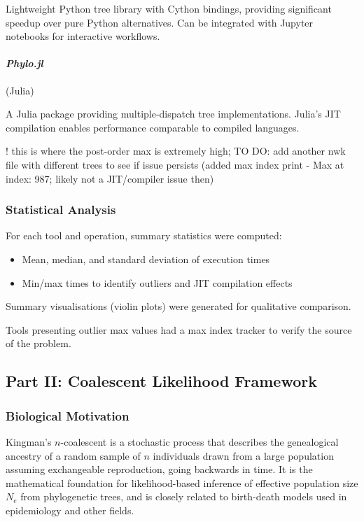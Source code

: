 \documentclass[11pt, a4paper]{article}
\newcommand{\phylo}{\textit{Phylo.jl}}
\begin{document}
Lightweight Python tree library with Cython bindings, providing significant speedup over pure Python alternatives. Can be integrated with Jupyter notebooks for interactive workflows.

\paragraph{\phylo} (Julia)

A Julia package providing multiple-dispatch tree implementations. Julia's JIT compilation enables performance comparable to compiled languages.

! this is where the post-order max is extremely high; TO DO: add another nwk file with different trees to see if issue persists (added max index print -   Max at index:  987; likely not a JIT/compiler issue then)

\subsubsection{Statistical Analysis}

For each tool and operation, summary statistics were computed:
\begin{itemize}
    \item Mean, median, and standard deviation of execution times
    \item Min/max times to identify outliers and JIT compilation effects
\end{itemize}

Summary visualisations (violin plots) were generated for qualitative comparison.

Tools presenting outlier max values had a max index tracker to verify the source of the problem.

\subsection{Part II: Coalescent Likelihood Framework}

\subsubsection{Biological Motivation}

Kingman's $n$-coalescent \cite{kingman1982} is a stochastic process that describes the genealogical ancestry of a random sample of $n$ individuals drawn from a large population assuming exchangeable reproduction, going backwards in time. It is the mathematical foundation for likelihood-based inference of effective population size $N_e$ from phylogenetic trees, and is closely related to birth-death models used in epidemiology and other fields.
\end{document}
